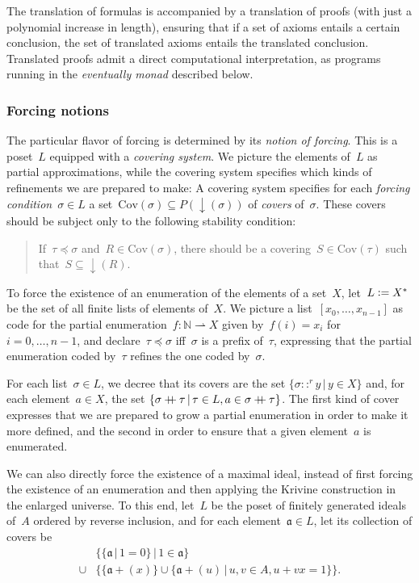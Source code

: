 \documentclass[envcountsect,envcountsame,runningheads]{llncs}
\newcommand{\aaa}{\mathfrak{a}}
\newcommand{\NN}{\mathbb{N}}
\newcommand{\defeq}{\vcentcolon=}
\newcommand{\Cov}{\mathrm{Cov}}
\newcommand{\concat}{\mathbin{{+}\mspace{-8mu}{+}}}
\renewcommand{\_}{\mathpunct{.}\,}
\begin{document}
The translation of formulas is accompanied by a translation of proofs (with
just a polynomial increase in length), ensuring that if a set of axioms
entails a certain conclusion, the set of translated axioms entails the
translated conclusion. Translated proofs admit a direct computational
interpretation, as programs running in the \emph{eventually monad} described
below.


\subsubsection{Forcing notions} The particular flavor of forcing is determined
by its \emph{notion of forcing}. This is a poset~$L$ equipped with a
\emph{covering system}. We picture the elements of~$L$ as partial
approximations, while the covering system specifies which kinds of refinements
we are prepared to make: A covering system specifies for each \emph{forcing condition}~$\sigma \in L$
a set~$\Cov(\sigma) \subseteq P({\downarrow}(\sigma))$
of \emph{covers} of~$\sigma$. These covers should be subject only to the
following stability condition:
\begin{quote}If~$\tau \preceq \sigma$ and~$R \in \Cov(\sigma)$, there should be a
covering~$S \in \Cov(\tau)$ such that~$S \subseteq {\downarrow}(R)$.
\end{quote}

\begin{example}\label{ex:notion-enum}To force the existence of an enumeration
of the elements of a set~$X$, let~$L \defeq X^*$ be the set of all finite lists
of elements of~$X$. We picture a list~$[x_0,\ldots,x_{n-1}]$ as code for the
partial enumeration~$f : \NN \rightharpoonup X$ given by~$f(i) = x_i$
for~$i=0,\ldots,n-1$, and declare~$\tau \preceq \sigma$ iff~$\sigma$ is a prefix
of~$\tau$, expressing that the partial enumeration coded by~$\tau$ refines the
one coded by~$\sigma$.

For each list~$\sigma \in L$, we decree that its covers are the set
$\{ \sigma ::^r y \,|\, y \in X \}$
and, for each element~$a \in X$, the set
$\{ \sigma \concat \tau \,|\, \tau \in L, a \in \sigma \concat \tau \}$.
The first kind of cover expresses that we are prepared to grow a partial
enumeration in order to make it more defined, and the second in order to ensure
that a given element~$a$ is enumerated.
\end{example}

\begin{example}\label{ex:notion-max}We can also directly force the existence of a maximal ideal,
instead of first forcing the existence of an enumeration and then applying the
Krivine construction in the enlarged universe. To this end, let~$L$ be the
poset of finitely generated ideals of~$A$ ordered by reverse inclusion,
and for each element~$\aaa \in L$, let its collection of covers be
\begin{align*}&\{ \{ \aaa \,|\, 1 = 0 \} \,|\, 1 \in \aaa \} \\ {} \cup {}&
  \{ \{ \aaa + (x) \} \cup \{ \aaa + (u) \,|\, u,v \in A, u + vx = 1 \} \}.
  \end{align*}
\end{example}
\end{document}
